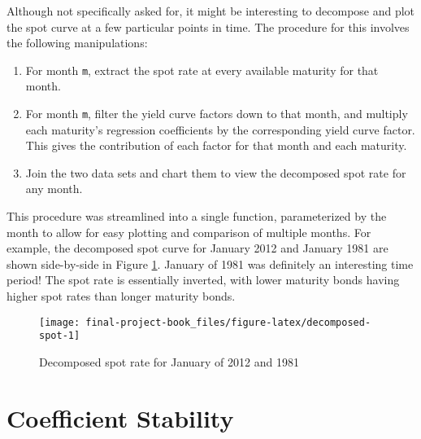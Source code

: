 \documentclass[openany]{book}
\providecommand{\tightlist}{%
  \setlength{\itemsep}{0pt}\setlength{\parskip}{0pt}}
\theoremstyle{definition}
\theoremstyle{definition}
\theoremstyle{definition}
\theoremstyle{remark}
\begin{document}
Although not specifically asked for, it might be interesting to
decompose and plot the spot curve at a few particular points in time.
The procedure for this involves the following manipulations:

\begin{enumerate}
\def\labelenumi{\arabic{enumi})}
\tightlist
\item
  For month \texttt{m}, extract the spot rate at every available
  maturity for that month.
\item
  For month \texttt{m}, filter the yield curve factors down to that
  month, and multiply each maturity's regression coefficients by the
  corresponding yield curve factor. This gives the contribution of each
  factor for that month and each maturity.
\item
  Join the two data sets and chart them to view the decomposed spot rate
  for any month.
\end{enumerate}

\small

\normalsize

\small

\normalsize

\small

\normalsize

\small

\normalsize

This procedure was streamlined into a single function, parameterized by
the month to allow for easy plotting and comparison of multiple months.
For example, the decomposed spot curve for January 2012 and January 1981
are shown side-by-side in Figure \ref{fig:decomposed-spot}. January of
1981 was definitely an interesting time period! The spot rate is
essentially inverted, with lower maturity bonds having higher spot rates
than longer maturity bonds.

\small

\begin{figure}[H]

{\centering \texttt{[image: final-project-book\_files/figure-latex/decomposed-spot-1]} 

}

\caption{Decomposed spot rate for January of 2012 and 1981}\label{fig:decomposed-spot}
\end{figure}

\normalsize

\hypertarget{coef-stability}{%
\section{Coefficient Stability}\label{coef-stability}}
\end{document}
